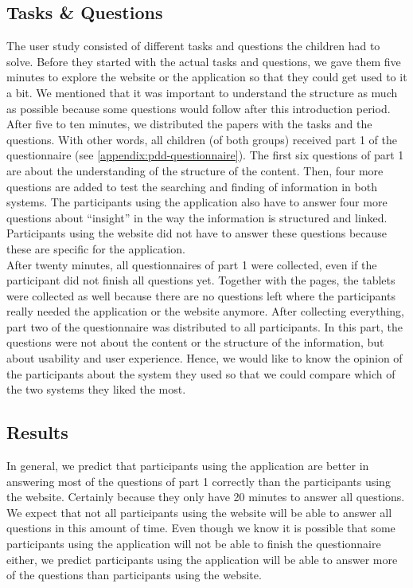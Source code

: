 \subsection{Tasks \& Questions}
The user study consisted of different tasks and questions the children had to solve. Before they started with the actual tasks and questions, we gave them five minutes to explore the website or the application so that they could get used to it a bit. We mentioned that it was important to understand the structure as much as possible because some questions would follow after this introduction period.\\

After five to ten minutes, we distributed the papers with the tasks and the questions. With other words, all children (of both groups) received part 1 of the questionnaire (see \autoref{appendix:pdd-questionnaire}). The first six questions of part 1 are about the understanding of the structure of the content. Then, four more questions are added to test the searching and finding of information in both systems. The participants using the application also have to answer four more questions about ``insight'' in the way the information is structured and linked. Participants using the website did not have to answer these questions because these are specific for the application.\\

After twenty minutes, all questionnaires of part 1 were collected, even if the participant did not finish all questions yet. Together with the pages, the tablets were collected as well because there are no questions left where the participants really needed the application or the website anymore. After collecting everything, part two of the questionnaire was distributed to all participants. In this part, the questions were not about the content or the structure of the information, but about usability and user experience. Hence, we would like to know the opinion of the participants about the system they used so that we could compare which of the two systems they liked the most.



\subsection{Results}
In general, we predict that participants using the application are better in answering most of the questions of part 1 correctly than the participants using the website. Certainly because they only have 20 minutes to answer all questions. We expect that not all participants using the website will be able to answer all questions in this amount of time. Even though we know it is possible that some participants using the application will not be able to finish the questionnaire either, we predict participants using the application will be able to answer more of the questions than participants using the website.\\

